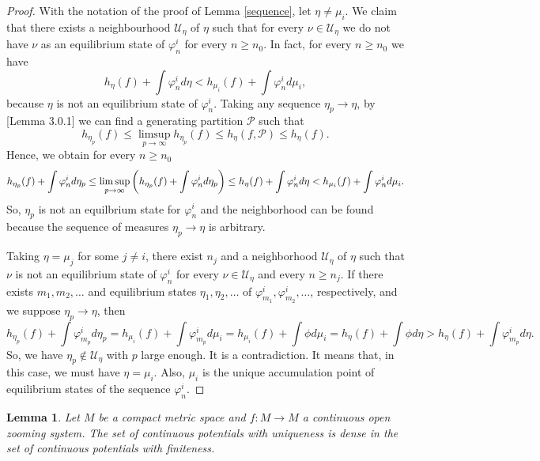 \documentclass[12pt,a4paper]{amsart}
\theoremstyle{plain}
\newtheorem{lemma}{Lemma}[subsection]
\begin{document}
\begin{proof}
	With the notation of the proof of Lemma \ref{sequence}, let $\eta \neq \mu_{i}$. We claim that there exists a neighbourhood $\mathcal{U}_{\eta}$ of $\eta$ such that for every $\nu \in \mathcal{U}_{\eta}$ we do not have $\nu$ as an equilibrium state of $\varphi_{n}^{i}$ for every $n \geq n_{0}$. In fact, for every $n \geq n_{0}$ we have
	\[
	h_{\eta}(f) + \int \varphi_{n}^{i} d\eta  < h_{\mu_{i}}(f) + \int \varphi_{n}^{i} d\mu_{i},
	\]
	because $\eta$ is not an equilibrium state of $\varphi_{n}^{i}$. Taking any sequence $\eta_{p} \to \eta$, by \cite{BiS}[Lemma 3.0.1] we can find a generating partition $\mathcal{P}$ such that
	\[
	h_{\eta_{p}}(f) \leq \limsup_{p \to \infty}h_{\eta_{p}}(f) \leq h_{\eta}(f,\mathcal{P}) \leq h_{\eta}(f).
	\]
	Hence, we obtain for every $n \geq n_{0}$
	\[
	h_{\eta_{p}}(f) + \int \varphi_{n}^{i} d\eta_{p} \leq \limsup_{p \to \infty}\bigg{(}h_{\eta_{p}}(f) + \int \varphi_{n}^{i} d\eta_{p} \bigg{)} \leq h_{\eta}(f) + \int \varphi_{n}^{i} d\eta  < h_{\mu_{i}}(f) + \int \varphi_{n}^{i} d\mu_{i}.
	\]
	So, $\eta_{p}$ is not an equilbrium state for $\varphi_{n}^{i}$ and the neighborhood can be found because the sequence of measures $\eta_{p} \to \eta$ is arbitrary.
	
	Taking $\eta = \mu_{j}$ for some $j \neq i$, there exist $n_{j}$ and a neighborhood $\mathcal{U}_{\eta}$ of $\eta$ such that $\nu$ is not an equilibrium state of $\varphi_{n}^{i}$ for every $\nu \in \mathcal{U}_{\eta}$ and every $n \geq n_{j}$. If there exists $m_{1}, m_{2}, \dots$ and equilibrium states $\eta_{1}, \eta_{2}, \dots$ of $\varphi_{m_{1}}^{i}, \varphi_{m_{2}}^{i}, \dots$, respectively, and we suppose $\eta_{p} \to \eta$, then
	\[
	h_{\eta_{p}}(f) + \int \varphi_{m_{p}}^{i} d\eta_{p}  = h_{\mu_{i}}(f) + \int \varphi_{m_{p}}^{i} d\mu_{i} = h_{\mu_{i}}(f) + \int \phi d\mu_{i} = h_{\eta}(f) + \int \phi d\eta > h_{\eta}(f) + \int \varphi_{m_{p}}^{i} d\eta.
	\]
	So, we have $\eta_{p} \not \in \mathcal{U}_{\eta}$ with $p$ large enough. It is a contradiction. It means that, in this case, we must have $\eta = \mu_{i}$. Also, $\mu_{i}$ is the unique accumulation point of equilibrium states of the sequence $\varphi_{n}^{i} $.
\end{proof}
\begin{lemma}\label{unique}
	Let $M$ be a compact metric space and $f: M \to M$ a continuous open zooming system. The set of continuous potentials with uniqueness is dense in the set of continuous potentials with finiteness.
\end{lemma} 
\end{document}
